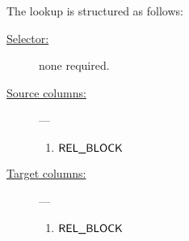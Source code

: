 The lookup is structured as follows:
\begin{description}
	\item[\underline{Selector:}] none required.
	\item[\underline{Source columns:}] ---
		\begin{multicols}{1}
			\begin{enumerate}
				\item $\textsf{REL\_BLOCK}$
			\end{enumerate}
		\end{multicols}
	\item[\underline{Target columns:}] ---
		\begin{multicols}{1}
			\begin{enumerate}
				\item $\textsf{REL\_BLOCK}$
			\end{enumerate}
		\end{multicols}
\end{description}
